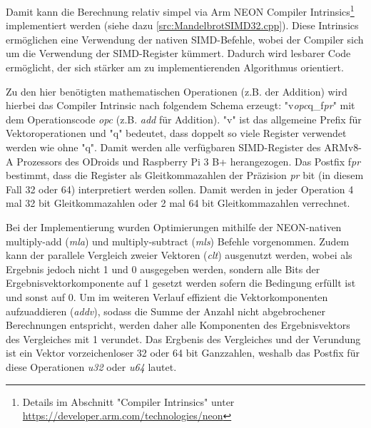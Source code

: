 Damit kann die Berechnung relativ simpel via Arm NEON Compiler Intrinsics\footnote{Details im Abschnitt "Compiler Intrinsics" unter \url{https://developer.arm.com/technologies/neon}} implementiert werden (siehe dazu \autoref{src:MandelbrotSIMD32.cpp}).
Diese Intrinsics ermöglichen eine Verwendung der nativen SIMD-Befehle, wobei der Compiler sich um die Verwendung der SIMD-Register kümmert.
Dadurch wird lesbarer Code ermöglicht, der sich stärker am zu implementierenden Algorithmus orientiert.

Zu den hier benötigten mathematischen Operationen (z.B. der Addition) wird hierbei das Compiler Intrinsic nach folgendem Schema erzeugt:
"v\textit{opc}q\_f\textit{pr}" mit dem Operationscode \textit{opc} (z.B. \textit{add} für Addition).
"v" ist das allgemeine Prefix für Vektoroperationen und "q" bedeutet, dass doppelt so viele Register verwendet werden wie ohne "q".
Damit werden alle verfügbaren SIMD-Register des ARMv8-A Prozessors des ODroids und Raspberry Pi 3 B+ herangezogen.
Das Postfix f\textit{pr} bestimmt, dass die Register als Gleitkommazahlen der Präzision \textit{pr} bit (in diesem Fall 32 oder 64) interpretiert werden sollen.
Damit werden in jeder Operation 4 mal 32 bit Gleitkommazahlen oder 2 mal 64 bit Gleitkommazahlen verrechnet.

Bei der Implementierung wurden Optimierungen mithilfe der NEON-nativen multiply-add (\textit{mla}) und multiply-subtract (\textit{mls}) Befehle vorgenommen.
Zudem kann der parallele Vergleich zweier Vektoren (\textit{clt}) ausgenutzt werden, wobei als Ergebnis jedoch nicht 1 und 0 ausgegeben werden,
sondern alle Bits der Ergebnisvektorkomponente auf 1 gesetzt werden sofern die Bedingung erfüllt ist und sonst auf 0.
Um im weiteren Verlauf effizient die Vektorkomponenten aufzuaddieren (\textit{addv}), sodass die Summe der Anzahl nicht abgebrochener Berechnungen entspricht,
werden daher alle Komponenten des Ergebnisvektors des Vergleiches mit 1 verundet.
Das Ergbenis des Vergleiches und der Verundung ist ein Vektor vorzeichenloser 32 oder 64 bit Ganzzahlen, weshalb das
Postfix für diese Operationen \textit{u32} oder \textit{u64} lautet.

\begin{figure}
    
\end{figure}
